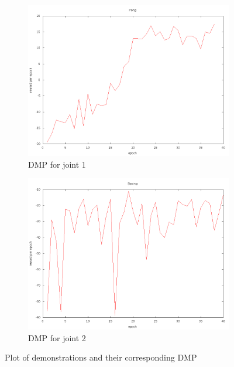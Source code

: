 \documentclass[a4paper]{article}
\begin{document}
\begin{figure}
\centering
\begin{subfigure}{.5\textwidth}
  \centering
  \includegraphics[width=.8\linewidth]{pong.png}
  \caption{DMP for joint 1}
  \label{fig:sub1}
\end{subfigure}%
\begin{subfigure}{.5\textwidth}
  \centering
  \includegraphics[width=.8\linewidth]{boxing.png}
  \caption{DMP for joint 2}
  \label{fig:sub2}
\end{subfigure}
\caption{Plot of demonstrations and their corresponding DMP}
\label{fig:test}
\end{figure}


  
\end{document}
